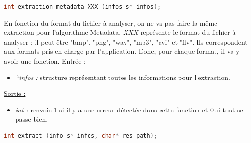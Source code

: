 \documentclass[11pt]{article}
\begin{document}
\begin{lstlisting}[language=c]
int extraction_metadata_XXX (infos_s* infos);
\end{lstlisting}

En fonction du format du fichier à analyser, on ne va pas faire la même 
extraction pour l'algorithme Metadata. 
\textit{XXX} représente le format du fichier à analyser : il peut être 
"bmp", "png", "wav", "mp3", "avi" et "flv". Ils correspondent aux formats 
pris en charge par l'application. Donc, pour chaque format, il va y avoir 
une fonction.  
\newline
\underline{Entrée :} 
\begin{itemize}
\item \textit{*infos :} structure représentant toutes les informations pour 
l'extraction. 
\end{itemize}
\underline{Sortie :} 
\begin{itemize}
\item \textit{int :} renvoie 1 si il y a une erreur détectée dans cette 
fonction et 0 si tout se passe bien.  
\newline 
\end{itemize}



\begin{lstlisting}[language=c]
int extract (info_s* infos, char* res_path); 
\end{lstlisting}
\end{document}
